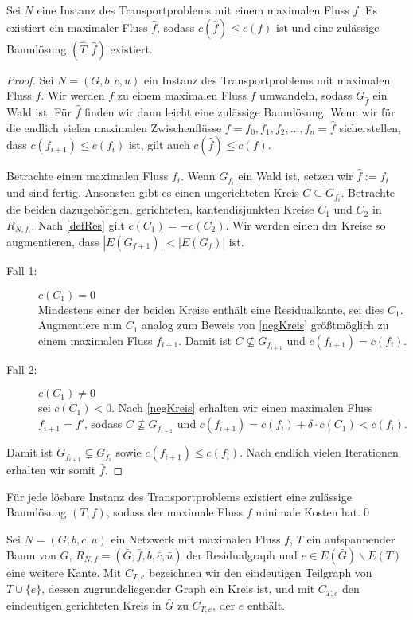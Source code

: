 \begin{thm}\label{BLex}Sei $N$ eine Instanz des Transportproblems mit einem maximalen Fluss $f$. Es existiert ein maximaler Fluss $\hat{f}$, sodass $c(\hat{f})\leq c(f)$ ist und eine zulässige Baumlösung $(\hat{T},\hat{f})$ existiert.\end{thm}
\begin{proof}Sei $N=(G,b,c,u)$ ein Instanz des Transportproblems mit maximalen Fluss $f$. Wir werden $f$ zu einem maximalen Fluss $\hat{f}$ umwandeln, sodass $G_{\hat{f}}$ ein Wald ist. Für $\hat{f}$ finden wir dann leicht eine zulässige Baumlösung. Wenn wir für die endlich vielen maximalen Zwischenflüsse $f=f_0,f_1,f_2,\ldots,f_n=\hat{f}$ sicherstellen, dass $c(f_{i+1})\leq c(f_i)$ ist, gilt auch $c(\hat{f})\leq c(f)$.

Betrachte einen maximalen Fluss $f_i$. Wenn $G_{f_i}$ ein Wald ist, setzen wir $\hat{f}:=f_i$ und sind fertig. Ansonsten gibt es einen ungerichteten Kreis $C\subseteq G_{f_i}$. Betrachte die beiden dazugehörigen, gerichteten, kantendisjunkten Kreise $C_1$ und $C_2$ in $R_{N,f_i}$. Nach \cref{defRes} gilt $c(C_1)=-c(C_2)$. Wir werden einen der Kreise so augmentieren, dass $|E(G_{f+1})|<|E(G_f)|$ ist.
\begin{description}
\item[Fall 1:] $c(C_1)=0$\\
	Mindestens einer der beiden Kreise enthält eine Residualkante, sei dies \obda $C_1$. Augmentiere nun $C_1$ analog zum Beweis von \cref{negKreis} größtmöglich zu einem maximalen Fluss $f_{i+1}$. Damit ist $C\nsubseteq G_{f_{i+1}}$ und $c(f_{i+1}) = c(f_i)$.
\item[Fall 2:] $c(C_1)\neq0$\\
	\Obda sei $c(C_1)<0$. Nach \cref{negKreis} erhalten wir einen maximalen Fluss $f_{i+1}=f'$, sodass $C\nsubseteq G_{f_{i+1}}$ und $c(f_{i+1}) = c(f_i) + \delta\cdot c(C_1)<c(f_i)$.
\end{description}

Damit ist $G_{f_{i+1}}\subsetneq G_{f_i}$ sowie $c(f_{i+1})\leq c(f_i)$. Nach endlich vielen Iterationen erhalten wir somit $\hat{f}$.
\end{proof}

\begin{kor}\label{TP}Für jede lösbare Instanz des Transportproblems existiert eine zulässige Baumlösung $(T,f)$, sodass der maximale Fluss $f$ minimale Kosten hat.\qed\end{kor}

\begin{nota}Sei $N=(G,b,c,u)$ ein Netzwerk mit maximalen Fluss $f$, $T$ ein aufspannender Baum von $G$, $R_{N,f}=(\bar{G},\bar{f},b,\bar{c},\bar{u})$ der Residualgraph und $e\in E(\bar{G})\backslash E(T)$ eine weitere Kante. Mit $C_{T,e}$ bezeichnen wir den eindeutigen Teilgraph von $T\cup\{e\}$, dessen zugrundeliegender Graph ein Kreis ist, und mit  $\bar{C}_{T,e}$ den eindeutigen gerichteten Kreis in $\bar{G}$ zu $C_{T,e}$, der $e$ enthält.\end{nota}


